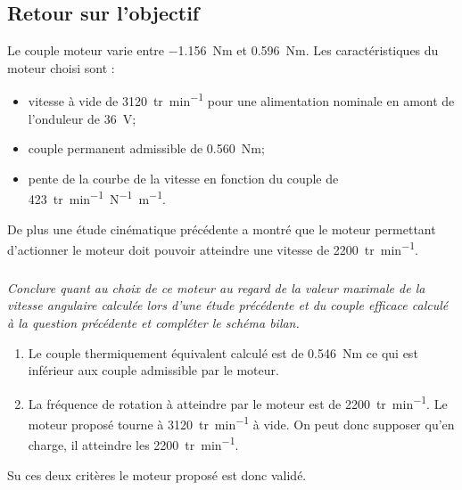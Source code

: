 \begin{multicols}{2}
\subsection*{Retour sur l'objectif}

\ifprof
\else

Le couple moteur varie entre \SI{-1,156}{Nm} et \SI{0,596}{Nm}.
Les caractéristiques du moteur choisi sont :
\begin{itemize}
\item vitesse à vide de \SI{3120}{tr.min^{-1}} pour une alimentation nominale en amont de l’onduleur de \SI{36}{V};
\item couple permanent admissible de \SI{0,560}{Nm};
\item pente de la courbe de la vitesse en fonction du couple de \SI{423}{tr.min^{-1}N^{-1}m^{-1}}.
\end{itemize}

De plus une étude cinématique précédente a montré que le moteur permettant d'actionner le moteur doit pouvoir atteindre une vitesse de \SI{2200}{tr.min^{-1}}.

\fi


\subparagraph{} \textit{Conclure quant au choix de ce moteur au regard de la valeur maximale de la vitesse angulaire calculée lors d'une étude précédente et du couple efficace calculé à la question précédente et compléter le schéma bilan.}

\ifprof
\begin{corrige}
\begin{enumerate}
\item Le couple thermiquement équivalent calculé est de \SI{0,546}{Nm} ce qui est inférieur aux couple admissible par le moteur. 
\item La fréquence de rotation à atteindre par le moteur est de \SI{2200}{tr.min^{-1}}. Le moteur proposé tourne à \SI{3120}{tr.min^{-1}} à vide. On peut donc supposer qu'en charge, il atteindre les \SI{2200}{tr.min^{-1}}.
\end{enumerate}
Su ces deux critères le moteur proposé est donc validé. 
\end{corrige}
\else
\fi

\ifprof
\else


\end{multicols}
